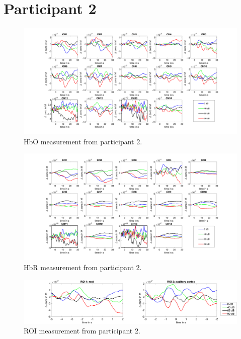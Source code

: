 \section {Participant 2}

\begin{figure}[H]
  \centering
    \includegraphics[scale=.4]{bilder/HbO_Mole/sub_gleb2_s_HbO.png}
  \caption{HbO measurement from participant 2.}
  \label{fig:somesignal}
\end{figure}

\begin{figure}[H]
  \centering
    \includegraphics[scale=.4]{bilder/HbR_Mole/sub_gleb2_s_HbR.png}
  \caption{HbR measurement from participant 2.}
  \label{fig:somesignal}
\end{figure}

\begin{figure}[H]
  \centering
    \includegraphics[scale=.29]{bilder/ROI/sub_gleb2_s_HbO.png}
  \caption{ROI measurement from participant 2.}
\end{figure}


